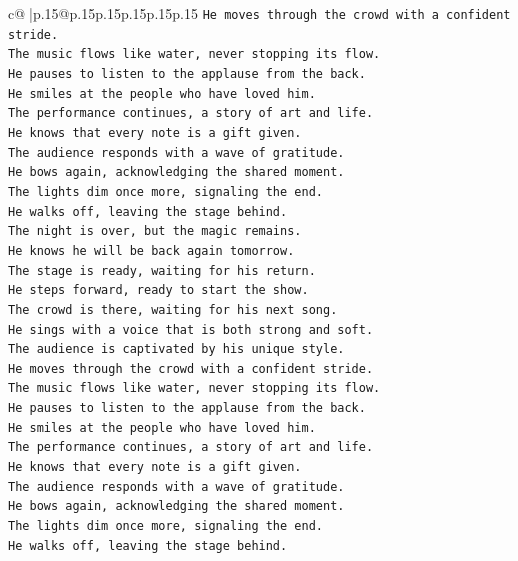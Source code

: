 \documentclass{article}
\begin{document}
{\begin{supertabular}{c@{$\;$}|p{.15\linewidth}@{}p{.15\linewidth}p{.15\linewidth}p{.15\linewidth}p{.15\linewidth}p{.15\linewidth}}
{{{\texttt{He moves through the crowd with a confident stride.} \\
\texttt{The music flows like water, never stopping its flow.} \\
\texttt{He pauses to listen to the applause from the back.} \\
\texttt{He smiles at the people who have loved him.} \\
\texttt{The performance continues, a story of art and life.} \\
\texttt{He knows that every note is a gift given.} \\
\texttt{The audience responds with a wave of gratitude.} \\
\texttt{He bows again, acknowledging the shared moment.} \\
\texttt{The lights dim once more, signaling the end.} \\
\texttt{He walks off, leaving the stage behind.} \\
\texttt{The night is over, but the magic remains.} \\
\texttt{He knows he will be back again tomorrow.} \\
\texttt{The stage is ready, waiting for his return.} \\
\texttt{He steps forward, ready to start the show.} \\
\texttt{The crowd is there, waiting for his next song.} \\
\texttt{He sings with a voice that is both strong and soft.} \\
\texttt{The audience is captivated by his unique style.} \\
\texttt{He moves through the crowd with a confident stride.} \\
\texttt{The music flows like water, never stopping its flow.} \\
\texttt{He pauses to listen to the applause from the back.} \\
\texttt{He smiles at the people who have loved him.} \\
\texttt{The performance continues, a story of art and life.} \\
\texttt{He knows that every note is a gift given.} \\
\texttt{The audience responds with a wave of gratitude.} \\
\texttt{He bows again, acknowledging the shared moment.} \\
\texttt{The lights dim once more, signaling the end.} \\
\texttt{He walks off, leaving the stage behind.} \\
}}}
\end{supertabular}}
\end{document}
